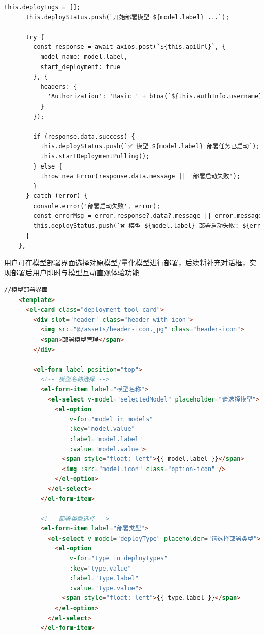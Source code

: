 \documentclass[AutoFakeBold,AutoFakeSlant,language=chinese,degree=bachelor]{sustechthesis}
\begin{document}
\begin{itemize}
\begin{lstlisting}[language=HTML]
      this.deployLogs = [];
      this.deployStatus.push(`开始部署模型 ${model.label} ...`);

      try {
        const response = await axios.post(`${this.apiUrl}`, {
          model_name: model.label,
          start_deployment: true
        }, {
          headers: {
            'Authorization': 'Basic ' + btoa(`${this.authInfo.username}:${this.authInfo.password}`)
          }
        });

        if (response.data.success) {
          this.deployStatus.push(`✅ 模型 ${model.label} 部署任务已启动`);
          this.startDeploymentPolling();
        } else {
          throw new Error(response.data.message || '部署启动失败');
        }
      } catch (error) {
        console.error('部署启动失败', error);
        const errorMsg = error.response?.data?.message || error.message;
        this.deployStatus.push(`❌ 模型 ${model.label} 部署启动失败: ${errorMsg}`);
      }
    },
    \end{lstlisting}
    用户可在模型部署界面选择对原模型/量化模型进行部署，后续将补充对话框，实现部署后用户即时与模型互动直观体验功能
    \begin{lstlisting}[language=HTML]
    //模型部署界面
    <template>
      <el-card class="deployment-tool-card">
        <div slot="header" class="header-with-icon">
          <img src="@/assets/header-icon.jpg" class="header-icon">
          <span>部署模型管理</span>
        </div>
    
        <el-form label-position="top">
          <!-- 模型名称选择 -->
          <el-form-item label="模型名称">
            <el-select v-model="selectedModel" placeholder="请选择模型">
              <el-option
                  v-for="model in models"
                  :key="model.value"
                  :label="model.label"
                  :value="model.value">
                <span style="float: left">{{ model.label }}</span>
                <img :src="model.icon" class="option-icon" />
              </el-option>
            </el-select>
          </el-form-item>
    
          <!-- 部署类型选择 -->
          <el-form-item label="部署类型">
            <el-select v-model="deployType" placeholder="请选择部署类型">
              <el-option
                  v-for="type in deployTypes"
                  :key="type.value"
                  :label="type.label"
                  :value="type.value">
                <span style="float: left">{{ type.label }}</span>
              </el-option>
            </el-select>
          </el-form-item>
    

\end{lstlisting}
\end{itemize}
\end{document}
